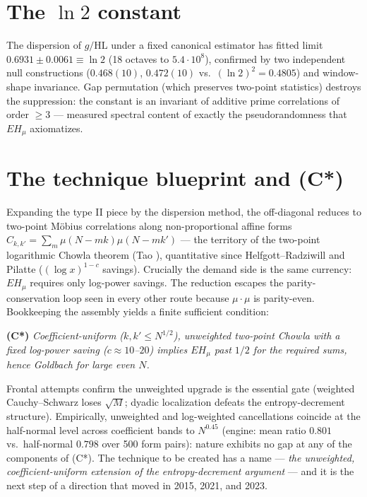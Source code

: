 \documentclass[11pt]{article}
\theoremstyle{definition}
\begin{document}
\section{The $\ln 2$ constant}

The dispersion of $g/\mathrm{HL}$ under a fixed canonical estimator has
fitted limit $0.6931 \pm 0.0061 \equiv \ln 2$ (18 octaves to $5.4\cdot
10^8$), confirmed by two independent null constructions ($0.468(10)$,
$0.472(10)$ vs.\ $(\ln 2)^2 = 0.4805$) and window-shape invariance. Gap
permutation (which preserves two-point statistics) destroys the
suppression: the constant is an invariant of additive prime
correlations of order $\ge 3$ --- measured spectral content of exactly
the pseudorandomness that $EH_\mu$ axiomatizes.

\section{The technique blueprint and (C*)}

Expanding the type II piece by the dispersion method, the off-diagonal
reduces to two-point M\"obius correlations along non-proportional
affine forms $C_{k,k'} = \sum_m \mu(N{-}mk)\mu(N{-}mk')$ --- the
territory of the two-point logarithmic Chowla theorem (Tao \cite{Tao}),
quantitative since Helfgott--Radziwill and Pilatte \cite{Pil}
($(\log x)^{1-c}$ savings). Crucially the demand side is the same
currency: $EH_\mu$ requires only log-power savings. The reduction
escapes the parity-conservation loop seen in every other route because
$\mu\cdot\mu$ is parity-even. Bookkeeping the assembly yields a finite
sufficient condition:

\medskip
\noindent\textbf{(C*)} \emph{Coefficient-uniform ($k, k' \le N^{1/2}$),
unweighted two-point Chowla with a fixed log-power saving ($c \approx
10$--$20$) implies $EH_\mu$ past $1/2$ for the required sums, hence
Goldbach for large even $N$.}
\medskip

Frontal attempts confirm the unweighted upgrade is the essential gate
(weighted Cauchy--Schwarz loses $\sqrt M$; dyadic localization defeats
the entropy-decrement structure). Empirically, unweighted and
log-weighted cancellations coincide at the half-normal level across
coefficient bands to $N^{0.45}$ (engine: mean ratio $0.801$ vs.\
half-normal $0.798$ over 500 form pairs): nature exhibits no gap at any
of the components of (C*). The technique to be created has a name ---
\emph{the unweighted, coefficient-uniform extension of the
entropy-decrement argument} --- and it is the next step of a direction
that moved in 2015, 2021, and 2023.
\end{document}

